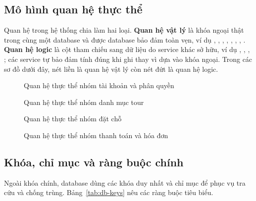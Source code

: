 \subsection{Mô hình quan hệ thực thể}

Quan hệ trong hệ thống chia làm hai loại. \textbf{Quan hệ vật lý} là khóa ngoại thật trong cùng một database và được database bảo đảm toàn vẹn, ví dụ , , , , , , , . \textbf{Quan hệ logic} là cột tham chiếu sang dữ liệu do service khác sở hữu, ví dụ , , , ; các service tự bảo đảm tính đúng khi ghi thay vì dựa vào khóa ngoại. Trong các sơ đồ dưới đây, nét liền là quan hệ vật lý còn nét đứt là quan hệ logic.

\begin{figure}[H]
\centering
\resizebox{\textwidth}{!}{}
\caption{Quan hệ thực thể nhóm tài khoản và phân quyền}
\label{fig:db-erd-auth}
\end{figure}

\begin{figure}[H]
\centering
\resizebox{\textwidth}{!}{}
\caption{Quan hệ thực thể nhóm danh mục tour}
\label{fig:db-erd-tour}
\end{figure}

\begin{figure}[H]
\centering
\resizebox{\textwidth}{!}{}
\caption{Quan hệ thực thể nhóm đặt chỗ}
\label{fig:db-erd-booking}
\end{figure}

\begin{figure}[H]
\centering
\resizebox{\textwidth}{!}{}
\caption{Quan hệ thực thể nhóm thanh toán và hóa đơn}
\label{fig:db-erd-payment}
\end{figure}

\subsection{Khóa, chỉ mục và ràng buộc chính}

Ngoài khóa chính, database dùng các khóa duy nhất và chỉ mục để phục vụ tra cứu và chống trùng. Bảng~\ref{tab:db-keys} nêu các ràng buộc tiêu biểu.

